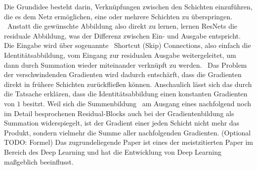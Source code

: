 Die Grundidee besteht darin, Verknüpfungen zwischen den Schichten einzuführen, die es dem Netz ermöglichen, eine oder mehrere Schichten zu \glqq überspringen\grqq{}. \ 
Anstatt die gewünschte Abbildung also direkt zu lernen, lernen ResNets die residuale Abbildung, was der Differenz zwischen Ein- und Ausgabe entspricht. Die Eingabe wird über sogenannte \
\glqq Shortcut (Skip) Connections\grqq{}, also einfach die Identitätsabbildung, vom Eingang zur residualen Ausgabe weitergeleitet, um dann durch Summation wieder miteinander verknüpft zu werden. \
Das Problem der verschwindenden Gradienten wird dadurch entschärft, dass die Gradienten direkt in frühere Schichten zurückfließen können. 
Anschaulich lässt sich das durch die Tatsache erklären, dass die Identitätsabbildung einen konstanten Gradienten von $1$ besitzt. Weil sich die Summenbildung \
am Ausgang eines nachfolgend noch im Detail besprochenen Residual-Blocks auch bei der Gradientenbildung als Summation widerspiegelt, ist der Gradient einer jeden Schicht nicht mehr das Produkt, sondern vielmehr die Summe aller nachfolgenden Gradienten. (Optional TODO: Formel) 
Das zugrundeliegende Paper ist eines der meistzitierten Paper im Bereich des Deep Learning und hat die Entwicklung von Deep Learning maßgeblich beeinflusst. \
